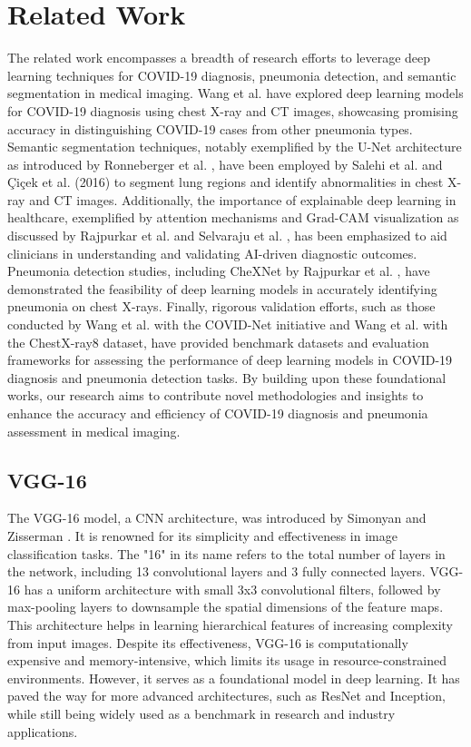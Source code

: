 \documentclass[10pt]{article}
\begin{document}
\section{Related Work}


The related work encompasses a breadth of research efforts to leverage deep learning techniques for COVID-19 diagnosis, pneumonia detection, and semantic segmentation in medical imaging. Wang et al. \cite{Wang2019} have explored deep learning models for COVID-19 diagnosis using chest X-ray and CT images, showcasing promising accuracy in distinguishing COVID-19 cases from other pneumonia types. Semantic segmentation techniques, notably exemplified by the U-Net architecture as introduced by Ronneberger et al. \cite{Ronneberger2015}, have been employed by Salehi et al. \cite{Salehi2023} and Çiçek et al. (2016) to segment lung regions and identify abnormalities in chest X-ray and CT images. Additionally, the importance of explainable deep learning in healthcare, exemplified by attention mechanisms and Grad-CAM visualization as discussed by Rajpurkar et al. \cite{Rajpurkar2017} and Selvaraju et al. \cite{Selvaraju2017}, has been emphasized to aid clinicians in understanding and validating AI-driven diagnostic outcomes. Pneumonia detection studies, including CheXNet by Rajpurkar et al. \cite{Rajpurkar2017}, have demonstrated the feasibility of deep learning models in accurately identifying pneumonia on chest X-rays. Finally, rigorous validation efforts, such as those conducted by Wang et al. \cite{Wang2019} with the COVID-Net initiative and Wang et al. \cite{Wang2017} with the ChestX-ray8 dataset, have provided benchmark datasets and evaluation frameworks for assessing the performance of deep learning models in COVID-19 diagnosis and pneumonia detection tasks. By building upon these foundational works, our research aims to contribute novel methodologies and insights to enhance the accuracy and efficiency of COVID-19 diagnosis and pneumonia assessment in medical imaging.

\subsection{VGG-16}
The VGG-16 model, a CNN architecture, was introduced by Simonyan and Zisserman \cite{Simonyan2015} \cite{Sharma2023}. It is renowned for its simplicity and effectiveness in image classification tasks. The "16" in its name refers to the total number of layers in the network, including 13 convolutional layers and 3 fully connected layers. VGG-16 has a uniform architecture with small 3x3 convolutional filters, followed by max-pooling layers to downsample the spatial dimensions of the feature maps. This architecture helps in learning hierarchical features of increasing complexity from input images. Despite its effectiveness, VGG-16 is computationally expensive and memory-intensive, which limits its usage in resource-constrained environments. However, it serves as a foundational model in deep learning. It has paved the way for more advanced architectures, such as ResNet and Inception, while still being widely used as a benchmark in research and industry applications.
\end{document}
